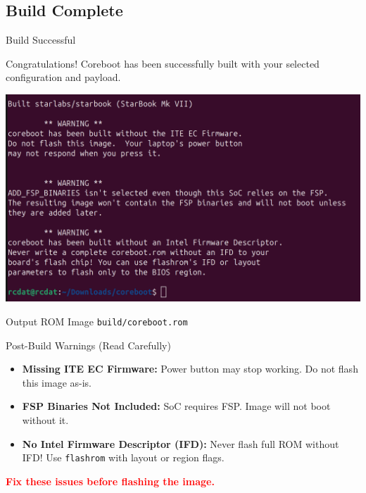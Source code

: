 \documentclass{beamer}
\begin{document}
	\subsection{Build Complete}
	\begin{frame}{Build Successful}
		\begin{block}{Congratulations!}
			Coreboot has been successfully built with your selected configuration and payload.
		\end{block}
		
		\centering
		\includegraphics[width=0.8\linewidth]{images/img7.png} 
		
		\begin{exampleblock}{Output ROM Image}
			\texttt{build/coreboot.rom}
		\end{exampleblock}
	\end{frame}
	
	
	
	
	
	
	\begin{frame}{Post-Build Warnings (Read Carefully)}
		\begin{itemize}
			\item \textbf{Missing ITE EC Firmware:} Power button may stop working. Do not flash this image as-is.
			\item \textbf{FSP Binaries Not Included:} SoC requires FSP. Image will not boot without it.
			\item \textbf{No Intel Firmware Descriptor (IFD):} Never flash full ROM without IFD! Use \texttt{flashrom} with layout or region flags.
		\end{itemize}
		
		\vspace{0.4cm}
		\textbf{\textcolor{red}{Fix these issues before flashing the image.}}
	\end{frame}
	
	
	
	
	
\end{document}
